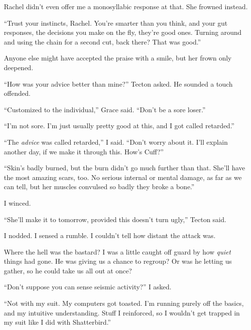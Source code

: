 Rachel didn't even offer me a monosyllabic response at that.  She frowned instead.



``Trust your instincts, Rachel.  You're smarter than you think, and your gut responses, the decisions you make on the fly, they're good ones.  Turning around and using the chain for a second cut, back there?  That was good.''



Anyone else might have accepted the praise with a smile, but her frown only deepened.



``How was your advice better than mine?'' Tecton asked.  He sounded a touch offended.



``Customized to the individual,'' Grace said.  ``Don't be a sore loser.''



``I'm not sore.  I'm just usually pretty good at this, and I got called retarded.''



``The \emph{advice} was called retarded,'' I said.  ``Don't worry about it.  I'll explain another day, if we make it through this.  How's Cuff?''



``Skin's badly burned, but the burn didn't go much further than that.  She'll have the most amazing scars, too.  No serious internal or mental damage, as far as we can tell, but her muscles convulsed so badly they broke a bone.''



I winced.



``She'll make it to tomorrow, provided this doesn't turn ugly,'' Tecton said.



I nodded.  I sensed a rumble.  I couldn't tell how distant the attack was.



Where the hell was the bastard?  I was a little caught off guard by how \emph{quiet} things had gone.  He was giving us a chance to regroup?  Or was he letting us gather, so he could take us all out at once?



``Don't suppose you can sense seismic activity?'' I asked.



``Not with my suit.  My computers got toasted.  I'm running purely off the basics, and my intuitive understanding.  Stuff I reinforced, so I wouldn't get trapped in my suit like I did with Shatterbird.''



